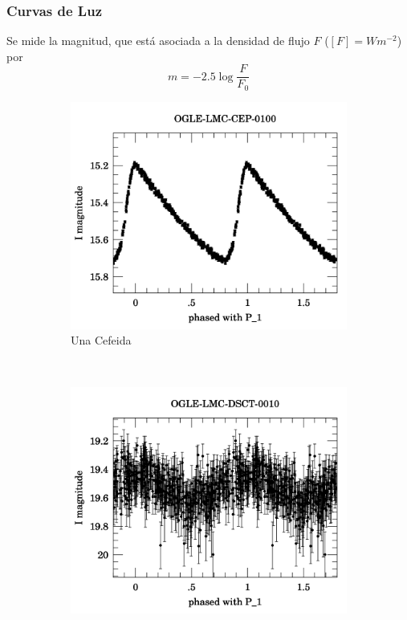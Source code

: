 \documentclass{beamer}
\begin{document}
\begin{frame}
  \frametitle{Curvas de Luz}
  Se mide la magnitud, que está asociada a la densidad de flujo $F$ ($[F] = Wm^{-2}$) por 
  \begin{equation}
    m = -2.5\log \frac{F}{F_0}
  \end{equation} 
  \begin{figure}
    \centering
    \begin{subfigure}[b]{0.4\textwidth}
      \includegraphics[width=\textwidth]{./img/OGLE-LMC-CEP-0100_1.png}
      \caption{Una Cefeida}
      \label{fig:gull}
    \end{subfigure}%
    ~ %
    \begin{subfigure}[b]{0.4\textwidth}
      \includegraphics[width=\textwidth]{./img/OGLE-LMC-DSCT-0010_1.png}

\end{subfigure}
\end{figure}
\end{frame}
\end{document}
